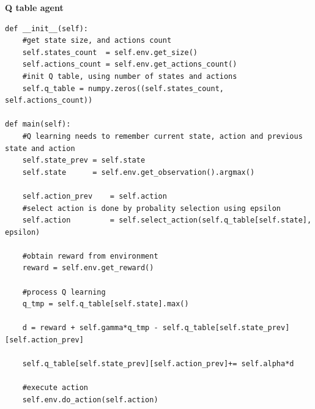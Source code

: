 \documentclass[xcolor=dvipsnames]{beamer}
\begin{document}
\begin{frame}[fragile]
{\bf Q table agent}


\begin{lstlisting}
def __init__(self):
    #get state size, and actions count
    self.states_count  = self.env.get_size()
    self.actions_count = self.env.get_actions_count()
    #init Q table, using number of states and actions
    self.q_table = numpy.zeros((self.states_count, self.actions_count))

def main(self):
    #Q learning needs to remember current state, action and previous state and action
    self.state_prev = self.state
    self.state      = self.env.get_observation().argmax()

    self.action_prev    = self.action
    #select action is done by probality selection using epsilon
    self.action         = self.select_action(self.q_table[self.state], epsilon)

    #obtain reward from environment
    reward = self.env.get_reward()

    #process Q learning
    q_tmp = self.q_table[self.state].max()

    d = reward + self.gamma*q_tmp - self.q_table[self.state_prev][self.action_prev]

    self.q_table[self.state_prev][self.action_prev]+= self.alpha*d

    #execute action
    self.env.do_action(self.action)
\end{lstlisting}


\end{frame}
\end{document}

